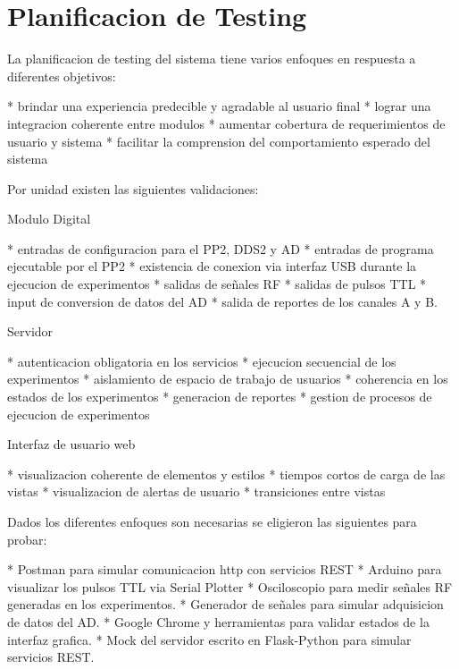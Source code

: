 \section{Planificacion de Testing}

La planificacion de testing del sistema tiene varios enfoques en respuesta a diferentes objetivos:

    * brindar una experiencia predecible y agradable al usuario final
    * lograr una integracion coherente entre modulos
    * aumentar cobertura de requerimientos de usuario y sistema
    * facilitar la comprension del comportamiento esperado del sistema

Por unidad existen las siguientes validaciones:

    Modulo Digital
        
        * entradas de configuracion para el PP2, DDS2 y AD
        * entradas de programa ejecutable por el PP2
        * existencia de conexion via interfaz USB durante la ejecucion de experimentos
        * salidas de señales RF
        * salidas de pulsos TTL
        * input de conversion de datos del AD
        * salida de reportes de los canales A y B.

    Servidor

        * autenticacion obligatoria en los servicios
        * ejecucion secuencial de los experimentos
        * aislamiento de espacio de trabajo de usuarios
        * coherencia en los estados de los experimentos
        * generacion de reportes
        * gestion de procesos de ejecucion de experimentos

    Interfaz de usuario web

        * visualizacion coherente de elementos y estilos
        * tiempos cortos de carga de las vistas
        * visualizacion de alertas de usuario
        * transiciones entre vistas

Dados los diferentes enfoques son necesarias se eligieron las siguientes para probar:

    * Postman para simular comunicacion http con servicios REST
    * Arduino para visualizar los pulsos TTL via Serial Plotter
    * Osciloscopio para medir señales RF generadas en los experimentos.
    * Generador de señales para simular adquisicion de datos del AD.
    * Google Chrome y herramientas para validar estados de la interfaz grafica.
    * Mock del servidor escrito en Flask-Python para simular servicios REST.